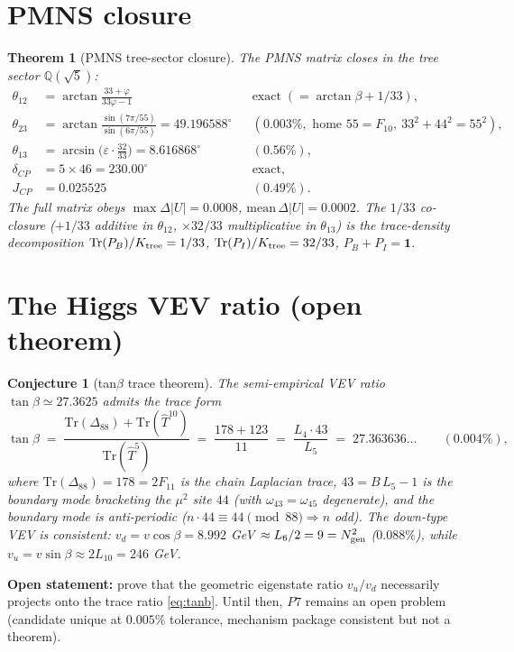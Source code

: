 \documentclass[12pt]{article}
\newtheorem{theorem}{Theorem}
\newtheorem{conjecture}{Conjecture}
\newcommand{\T}{\hat{T}}
\begin{document}
\section{PMNS closure}
\label{sec:pmns}
\begin{theorem}[PMNS tree-sector closure]
\label{thm:pmns}
The PMNS matrix closes in the tree sector $\mathbb{Q}(\sqrt5)$:
\begin{align}
\theta_{12} &= \arctan\frac{33+\varphi}{33\varphi-1} && \text{exact}
\; (= \arctan\beta + 1/33),\\
\theta_{23} &= \arctan\frac{\sin(7\pi/55)}{\sin(6\pi/55)}
= 49.196588^\circ && (0.003\%, \text{ home } 55=F_{10},\ 33^2{+}44^2{=}55^2),\\
\theta_{13} &= \arcsin\!\big(\varepsilon\cdot\tfrac{32}{33}\big)
= 8.616868^\circ && (0.56\%),\\
\delta_{CP} &= 5\times46 = 230.00^\circ && \text{exact},\\
J_{CP} &= 0.025525 && (0.49\%).
\end{align}
The full matrix obeys $\max\Delta|U| = 0.0008$, $\mathrm{mean}\,\Delta|U|
= 0.0002$. The $1/33$ co-closure ($+1/33$ additive in $\theta_{12}$,
$\times32/33$ multiplicative in $\theta_{13}$) is the trace-density
decomposition $\mathrm{Tr}(P_B)/K_{\rm tree} = 1/33$,
$\mathrm{Tr}(P_I)/K_{\rm tree} = 32/33$, $P_B + P_I = \mathbf{1}$.
\end{theorem}

\section{The Higgs VEV ratio (open theorem)}
\label{sec:tanbeta}
\begin{conjecture}[tan$\beta$ trace theorem]
\label{cnj:tanb}
The semi-empirical VEV ratio $\tan\beta \simeq 27.3625$ admits the trace
form
\begin{equation}
\label{eq:tanb}
\tan\beta \;=\; \frac{\mathrm{Tr}(\Delta_{88})+\mathrm{Tr}(\T^{10})}
{\mathrm{Tr}(\T^{5})}
\;=\; \frac{178+123}{11} \;=\; \frac{L_4\cdot 43}{L_5}
\;=\; 27.363636\ldots \qquad (0.004\%),
\end{equation}
where $\mathrm{Tr}(\Delta_{88}) = 178 = 2F_{11}$ is the chain Laplacian
trace, $43 = B\,L_5-1$ is the boundary mode bracketing the $\mu^2$ site
$44$ (with $\omega_{43}=\omega_{45}$ degenerate), and the boundary mode is
anti-periodic ($n\cdot 44 \equiv 44 \pmod{88} \Rightarrow n$ odd). The
down-type VEV is consistent: $v_d = v\cos\beta = 8.992$ GeV
$\approx L_6/2 = 9 = N_{\rm gen}^2$ ($0.088\%$), while
$v_u = v\sin\beta \approx 2L_{10} = 246$ GeV.
\end{conjecture}
\textbf{Open statement:} prove that the geometric eigenstate ratio
$v_u/v_d$ necessarily projects onto the trace ratio
\eqref{eq:tanb}. Until then, $P7$ remains an open problem (candidate
unique at $0.005\%$ tolerance, mechanism package consistent but not a
theorem).
\end{document}
